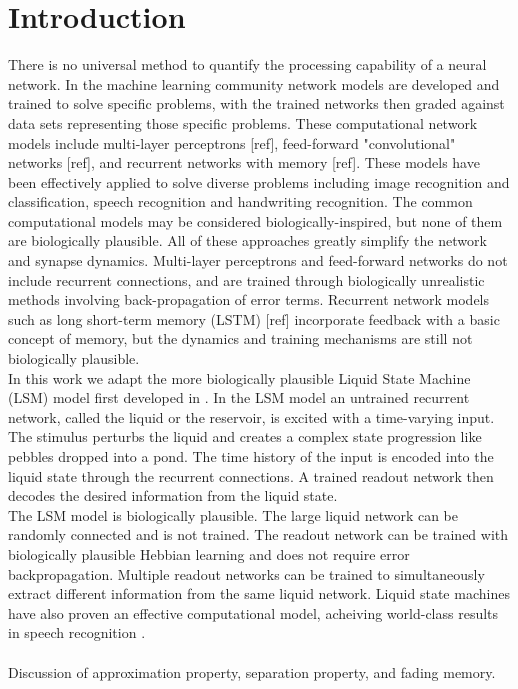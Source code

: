 \documentclass[a4paper,11pt]{article}
\begin{document}
\section{Introduction} 
There is no universal method to quantify the processing capability of a neural network.
In the machine learning community network models are developed and trained to solve specific problems, with the trained networks then graded against data sets representing those specific problems.
These computational network models include multi-layer perceptrons [ref], feed-forward "convolutional" networks [ref], and recurrent networks with memory [ref].
These models have been effectively applied to solve diverse problems including image recognition and classification, speech recognition and handwriting recognition.
The common computational models may be considered biologically-inspired, but none of them are biologically plausible.
All of these approaches greatly simplify the network and synapse dynamics.
Multi-layer perceptrons and feed-forward networks do not include recurrent connections, and are trained through biologically unrealistic methods involving back-propagation of error terms.
Recurrent network models such as long short-term memory (LSTM) [ref] incorporate feedback with a basic concept of memory, but the dynamics and training mechanisms are still not biologically plausible. \\
In this work we adapt the more biologically plausible Liquid State Machine (LSM) model first developed in \cite{maas2002}.
In the LSM model an untrained recurrent network, called the liquid or the reservoir, is excited with a time-varying input.
The stimulus perturbs the liquid and creates a complex state progression like pebbles dropped into a pond.
The time history of the input is encoded into the liquid state through the recurrent connections.
A trained readout network then decodes the desired information from the liquid state. \\
The LSM model is biologically plausible. 
The large liquid network can be randomly connected and is not trained.
The readout network can be trained with biologically plausible Hebbian learning and does not require error backpropagation.
Multiple readout networks can be trained to simultaneously extract different information from the same liquid network.
Liquid state machines have also proven an effective computational model, acheiving world-class results in speech recognition \cite{zhang2015}.
\\ \\
Discussion of approximation property, separation property, and fading memory.
\end{document}
